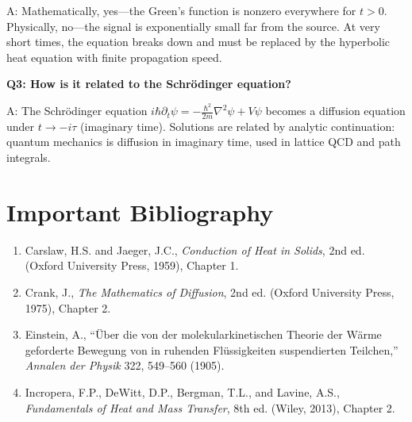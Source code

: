 A: Mathematically, yes---the Green's function is nonzero everywhere for $t > 0$. Physically, no---the signal is exponentially small far from the source. At very short times, the equation breaks down and must be replaced by the hyperbolic heat equation with finite propagation speed.

\textbf{Q3: How is it related to the Schr\"odinger equation?}

A: The Schr\"odinger equation $i\hbar \partial_t \psi = -\frac{\hbar^2}{2m}\nabla^2 \psi + V\psi$ becomes a diffusion equation under $t \to -i\tau$ (imaginary time). Solutions are related by analytic continuation: quantum mechanics is diffusion in imaginary time, used in lattice QCD and path integrals.
\section*{Important Bibliography}

\begin{enumerate}
\item Carslaw, H.S. and Jaeger, J.C., \textit{Conduction of Heat in Solids}, 2nd ed. (Oxford University Press, 1959), Chapter 1.
\item Crank, J., \textit{The Mathematics of Diffusion}, 2nd ed. (Oxford University Press, 1975), Chapter 2.
\item Einstein, A., ``\"Uber die von der molekularkinetischen Theorie der W\"arme geforderte Bewegung von in ruhenden Fl\"ussigkeiten suspendierten Teilchen,'' \textit{Annalen der Physik} 322, 549--560 (1905).
\item Incropera, F.P., DeWitt, D.P., Bergman, T.L., and Lavine, A.S., \textit{Fundamentals of Heat and Mass Transfer}, 8th ed. (Wiley, 2013), Chapter 2.
\end{enumerate}

